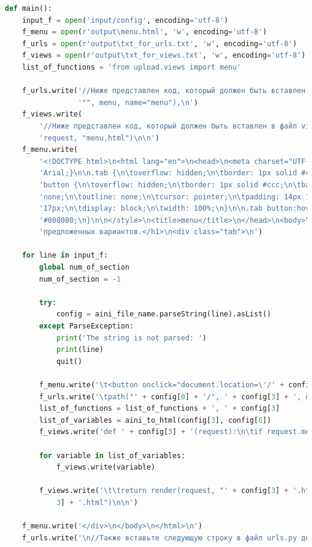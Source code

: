 \begin{lstlisting}[frame=single, label={rndhpcgui.2023.05.04.main}, caption={Функция main}, language={Python}] 
    def main():
    input_f = open('input/config', encoding='utf-8')
    f_menu = open(r'output\menu.html', 'w', encoding='utf-8')
    f_urls = open(r'output\txt_for_urls.txt', 'w', encoding='utf-8')
    f_views = open(r'output\txt_for_views.txt', 'w', encoding='utf-8')
    list_of_functions = 'from upload.views import menu'

    f_urls.write('//Ниже представлен код, который должен быть вставлен в файл urls.py в список urlpatterns\n\n\tpath('
                 '"", menu, name="menu"),\n')
    f_views.write(
        '//Ниже представлен код, который должен быть вставлен в файл views.py\n\ndef menu(request):\n\treturn render('
        'request, "menu.html")\n\n')
    f_menu.write(
        '<!DOCTYPE html>\n<html lang="en">\n<head>\n<meta charset="UTF-8">\n<style>\nbody {font-family: '
        'Arial;}\n\n.tab {\n\toverflow: hidden;\n\tborder: 1px solid #ccc;\n\tbackground-color: #f1f1f1;\n}\n\n.tab '
        'button {\n\toverflow: hidden;\n\tborder: 1px solid #ccc;\n\tbackground-color: #ddd;\n\tfloat: left;\n\tborder: '
        'none;\n\toutline: none;\n\tcursor: pointer;\n\tpadding: 14px 16px;\n\ttransition: 0.3s;\n\tfont-size: '
        '17px;\n\tdisplay: block;\n\twidth: 100%;\n}\n\n.tab button:hover {\n\tbackground-color: '
        '#808080;\n}\n\n</style>\n<title>menu</title>\n</head>\n<body>\n<h1>Здравствуйте! Выберите один из '
        'предложенных вариантов.</h1>\n<div class="tab">\n')

    for line in input_f:
        global num_of_section
        num_of_section = -1

        try:
            config = aini_file_name.parseString(line).asList()
        except ParseException:
            print('The string is not parsed: ')
            print(line)
            quit()

        f_menu.write('\t<button onclick="document.location=\'/' + config[0] + '/\'">' + config[6] + '</button>\n')
        f_urls.write('\tpath("' + config[0] + '/", ' + config[3] + ', name="' + config[3] + '"),\n')
        list_of_functions = list_of_functions + ', ' + config[3]
        list_of_variables = aini_to_html(config[3], config[6])
        f_views.write('def ' + config[3] + '(request):\n\tif request.method == "POST":\n')

        for variable in list_of_variables:
            f_views.write(variable)

        f_views.write('\t\treturn render(request, "' + config[3] + '.html")\n\treturn render(request, "' + config[
            3] + '.html")\n\n')

    f_menu.write('</div>\n</body>\n</html>\n')
    f_urls.write('\n//Также вставьте следующую строку в файл urls.py до списка urlpatterns\n' + list_of_functions)
\end{lstlisting}

